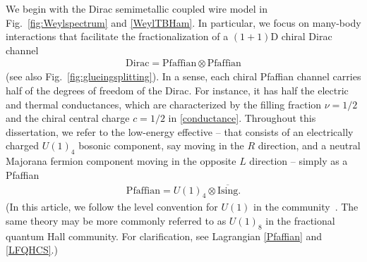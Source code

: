 We begin with the Dirac semimetallic coupled wire model in Fig.~\ref{fig:Weylspectrum} and \eqref{WeylTBHam}. In particular, we focus on many-body interactions that facilitate the fractionalization of a $(1+1)$D chiral Dirac channel \begin{align}\mathrm{Dirac}=\mathrm{Pfaffian}\otimes\mathrm{Pfaffian}\label{fractionalization}\end{align} (see also Fig.~\ref{fig:glueingsplitting}). In a sense, each chiral Pfaffian channel carries half of the degrees of freedom of the Dirac. For instance, it has half the electric and thermal conductances, which are characterized by the filling fraction $\nu=1/2$ and the chiral central charge $c=1/2$ in \eqref{conductance}. Throughout this dissertation, we refer to the low-energy effective \CFT -- that consists of an electrically charged $U(1)_4$ bosonic component, say moving in the $R$ direction, and a neutral Majorana fermion component moving in the opposite $L$ direction -- simply as a Pfaffian \CFT \begin{align}\mathrm{Pfaffian}=U(1)_4\otimes\overline{\mathrm{Ising}}.\label{PfaffianCFT}\end{align} (In this article, we follow the level convention for $U(1)$ in the \CFT community~\cite{bigyellowbook}. The same theory may be more commonly referred to as $U(1)_8$ in the fractional quantum Hall community. For clarification, see Lagrangian \eqref{Pfaffian} and \eqref{LFQHCS}.)

